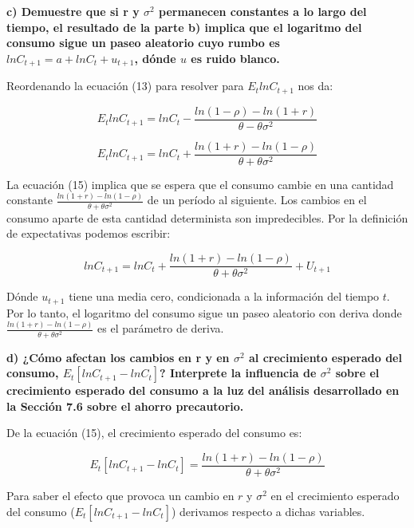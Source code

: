 \documentclass[
]{article}
\begin{document}
\textbf{c) Demuestre que si r y \(\sigma^2\) permanecen constantes a lo
largo del tiempo, el resultado de la parte b) implica que el logaritmo
del consumo sigue un paseo aleatorio cuyo rumbo es
\(lnC_{t+1}=a+lnC_t + u_{t+1}\), dónde \(u\) es ruido blanco.}

Reordenando la ecuación (13) para resolver para \(E_tlnC_{t+1}\) nos da:

\begin{equation}
E_t ln C_{t+1} =ln C_t - \frac { ln(1-\rho)-ln(1+r)}{\theta - \theta \sigma^2}
\end{equation}

\begin{equation}
E_tlnC_{t+1}=lnC_t + \frac {ln(1+r)-ln(1-\rho)}{\theta + \theta \sigma^2}
\end{equation}

La ecuación (15) implica que se espera que el consumo cambie en una
cantidad constante
\(\frac{ln(1+r)-ln(1- \rho)}{\theta + \theta \sigma^2}\) de un período
al siguiente. Los cambios en el consumo aparte de esta cantidad
determinista son impredecibles. Por la definición de expectativas
podemos escribir:

\begin{equation}
lnC_{t+1}=lnC_t+ \frac{ln(1+r)-ln(1- \rho)}{\theta + \theta \sigma^2}+U_{t+1}
\end{equation}

Dónde \(u_{t+1}\) tiene una media cero, condicionada a la información
del tiempo \(t\). Por lo tanto, el logaritmo del consumo sigue un paseo
aleatorio con deriva donde
\(\frac{ln(1+r)-ln(1- \rho)}{\theta + \theta \sigma^2}\) es el parámetro
de deriva.

\textbf{d) ¿Cómo afectan los cambios en r y en \(\sigma^2\) al
crecimiento esperado del consumo, \(E_t[ln C_{t+1}-ln C_t ]\)?
Interprete la influencia de \(\sigma^2\) sobre el crecimiento esperado
del consumo a la luz del análisis desarrollado en la Sección 7.6 sobre
el ahorro precautorio.}

De la ecuación (15), el crecimiento esperado del consumo es:

\begin{equation}
E_t[lnC_{t+1}-lnC_t]= \frac{ln(1+r)-ln(1- \rho)}{\theta + \theta \sigma^2}
\end{equation}

Para saber el efecto que provoca un cambio en \(r\) y \(\sigma^2\) en el
crecimiento esperado del consumo (\(E_t[lnC_{t+1}-lnC_t]\)) derivamos
respecto a dichas variables.
\end{document}
